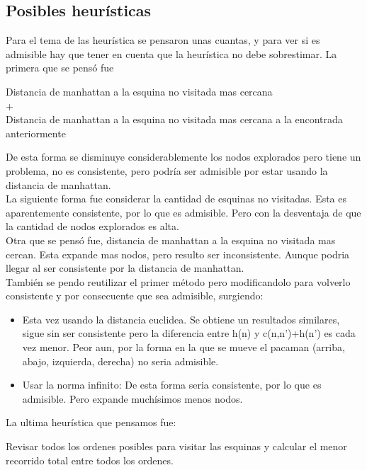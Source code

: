 \documentclass[12pt, titlepage, a4paper]{article}
\begin{document}
\subsection{Posibles heurísticas}
Para el tema de las heurística se pensaron unas cuantas, y para ver si es admisible hay que 
tener en cuenta que la heurística no debe sobrestimar. La primera que se pensó fue
\begin{center}
    Distancia de manhattan a la esquina no visitada mas cercana\\ 
    
    +\\ 
    
    Distancia de manhattan a la esquina no visitada mas cercana a la encontrada anteriormente 
\end{center}

De esta forma se disminuye considerablemente los nodos explorados 
pero tiene un problema, no es consistente, pero podría ser admisible por estar usando la 
distancia de manhattan.\\

La siguiente forma fue considerar la cantidad de esquinas no visitadas.
 Esta es aparentemente consistente, por lo que es admisible. Pero con la desventaja de que 
 la cantidad de nodos explorados es alta.\\ 

Otra que se pensó fue, distancia de manhattan a la esquina no visitada mas cercan. 
Esta expande mas nodos, pero resulto ser inconsistente. Aunque podria llegar al ser consistente por la 
distancia de manhattan.\\

También se pendo reutilizar el primer método pero modificandolo para volverlo consistente y 
por consecuente que sea admisible, surgiendo:
\begin{itemize}
    \item {Esta vez usando la distancia euclidea. Se obtiene un resultados similares,
            sigue sin ser consistente pero la diferencia entre h(n) y c(n,n')+h(n') es cada vez menor.
            Peor aun, por la forma en la que se mueve el pacaman (arriba, abajo, izquierda, derecha) 
            no seria admisible.}
    \item {Usar la norma infinito: De esta forma seria consistente, por lo que es admisible. 
            Pero expande muchísimos menos nodos.}
\end{itemize}

\noindent La ultima heurística que pensamos fue:
\begin{center}
    Revisar todos los ordenes posibles para visitar las esquinas 
    y calcular el menor recorrido total entre todos los ordenes. 
\end{center}
\end{document}
